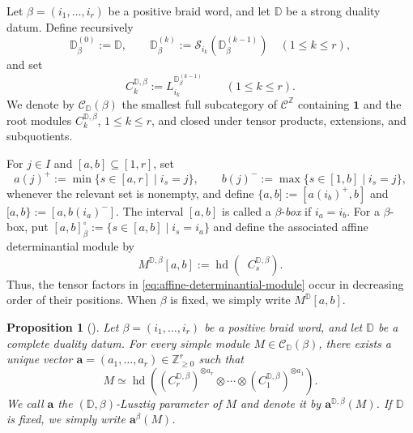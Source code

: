 \documentclass[12pt, reqno]{amsart}
\theoremstyle{plain}
\newtheorem{proposition}[theorem]{Proposition}
\theoremstyle{definition}
\numberwithin{equation}{section}
\newcommand{\ZZ}{\mathbb{Z}}
\newcommand{\DD}{\mathbb{D}}
\newcommand{\bfa}{\mathbf{a}}
\begin{document}
Let \(\beta=(i_1,\ldots,i_r)\) be a positive braid word, and let \(\DD\)
be a strong duality datum. Define recursively
\begin{equation}\label{eq:duality-data-along-beta}
    \DD_\beta^{(0)}:=\DD,
    \qquad
    \DD_\beta^{(k)}
    :=\mathscr S_{i_k}(\DD_\beta^{(k-1)})
    \quad (1\leq k\leq r),
\end{equation}
and set
\begin{equation}\label{eq:root-modules-along-beta}
    C_k^{\DD,\beta}
    :=L_{i_k}^{\DD_\beta^{(k-1)}}
    \qquad (1\leq k\leq r).
\end{equation}
We denote by \(\mathscr C_{\DD}(\beta)\) the smallest full subcategory of
\(\mathscr C^{\ZZ}\) containing \(\mathbf1\) and the root modules
\(C_k^{\DD,\beta}\), \(1\leq k\leq r\), and closed under tensor
products, extensions, and subquotients.

For \(j\in I\) and \([a,b]\subseteq[1,r]\), set
\begin{equation}\label{eq:colored-interval-endpoints}
    a(j)^+:=\min\{s\in[a,r]\mid i_s=j\},
    \qquad
    b(j)^-:=\max\{s\in[1,b]\mid i_s=j\},
\end{equation}
whenever the relevant set is nonempty, and define
\(\{a,b]:=[a(i_b)^+,b]\) and
\([a,b\}:=[a,b(i_a)^-]\). The interval \([a,b]\) is called a
\(\beta\)-\emph{box} if \(i_a=i_b\). For a \(\beta\)-box, put
\([a,b]_\beta^\circ:=\{s\in[a,b]\mid i_s=i_a\}\) and define the
associated affine determinantial module by
\begin{equation}\label{eq:affine-determinantial-module}
    M^{\DD,\beta}[a,b]
    :=\operatorname{hd}\left(
        \mathop{\bigotimes_{s\in[a,b]_\beta^\circ}^{\longleftarrow}}
        C_s^{\DD,\beta}
    \right).
\end{equation}
Thus, the tensor factors in \eqref{eq:affine-determinantial-module} occur
in decreasing order of their positions. When \(\beta\) is fixed, we simply
write \(M^{\DD}[a,b]\).

\begin{proposition}[{\cite[Lemma~5.26 and Proposition~5.33]
    {kashiwara2025monoidal}}]\label{pro:lusztig-parameter-modules}
    Let \(\beta=(i_1,\ldots,i_r)\) be a positive braid word, and let
    \(\DD\) be a complete duality datum. For every simple module
    \(M\in\mathscr C_{\DD}(\beta)\), there exists a unique vector
    \(\bfa=(a_1,\ldots,a_r)\in\ZZ_{\geq0}^r\) such that
    \begin{equation}\label{eq:Lusztig-parameter-factorization}
        M\simeq\operatorname{hd}\left(
            (C_r^{\DD,\beta})^{\otimes a_r}\otimes\cdots\otimes
            (C_1^{\DD,\beta})^{\otimes a_1}
        \right).
    \end{equation}
    We call \(\bfa\) the \((\DD,\beta)\)-\emph{Lusztig parameter} of
    \(M\) and denote it by \(\bfa^{\DD,\beta}(M)\). If \(\DD\) is
    fixed, we simply write \(\bfa^\beta(M)\).
\end{proposition}
\end{document}
